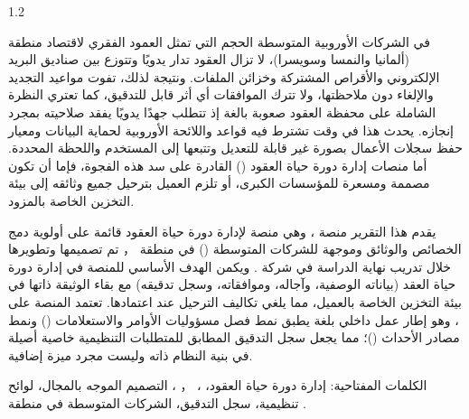 \begin{spacing}{1.2}

\begin{arabtext}
في الشركات الأوروبية المتوسطة الحجم التي تمثل العمود الفقري لاقتصاد منطقة 
(ألمانيا والنمسا وسويسرا)، لا تزال العقود تدار يدويًا وتتوزع بين صناديق البريد
الإلكتروني والأقراص المشتركة وخزائن الملفات. ونتيجة لذلك، تفوت مواعيد التجديد
والإلغاء دون ملاحظتها، ولا تترك الموافقات أي أثر قابل للتدقيق، كما تعتري النظرة الشاملة
على محفظة العقود صعوبة بالغة إذ تتطلب جهدًا يدويًا يفقد صلاحيته بمجرد إنجازه.
يحدث هذا في وقت تشترط فيه قواعد  واللائحة الأوروبية لحماية البيانات ومعيار
 حفظ سجلات الأعمال بصورة غير قابلة للتعديل وتتبعها إلى المستخدم
واللحظة المحددة. أما منصات إدارة دورة حياة العقود () القادرة على سد هذه
الفجوة، فإما أن تكون مصممة ومسعرة للمؤسسات الكبرى، أو تلزم العميل بترحيل جميع
وثائقه إلى بيئة التخزين الخاصة بالمزود.
\end{arabtext}

\begin{arabtext}
يقدم هذا التقرير منصة ، وهي منصة لإدارة دورة حياة العقود قائمة
على أولوية دمج الخصائص والوثائق وموجهة للشركات المتوسطة () في منطقة ，
تم تصميمها وتطويرها خلال تدريب نهاية الدراسة في شركة . ويكمن
الهدف الأساسي للمنصة في إدارة دورة حياة العقد (بياناته الوصفية، وآجاله، وموافقاته،
وسجل تدقيقه) مع بقاء الوثيقة ذاتها في بيئة التخزين الخاصة بالعميل، مما يلغي تكاليف
الترحيل عند اعتمادها. تعتمد المنصة على ، وهو إطار عمل داخلي بلغة
 يطبق نمط فصل مسؤوليات الأوامر والاستعلامات () ونمط مصادر الأحداث
()؛ مما يجعل سجل التدقيق المطابق للمتطلبات التنظيمية خاصية أصيلة
في بنية النظام ذاته وليست مجرد ميزة إضافية.
\end{arabtext}

\vspace{0.3cm}

\begin{arabtext}
الكلمات المفتاحية: إدارة دورة حياة العقود، ، ，
، التصميم الموجه بالمجال، لوائح تنظيمية، سجل التدقيق، الشركات المتوسطة في منطقة  .
\end{arabtext}


\end{spacing}
